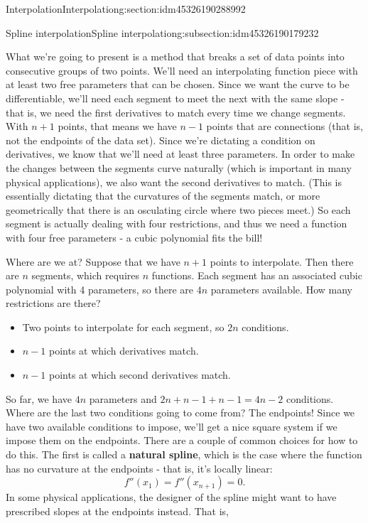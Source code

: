 \documentclass[oneside,10pt,]{article}
\newcommand{\terminology}[1]{\textbf{#1}}
\numberwithin{equation}{section}
\numberwithin{equation}{section}
\begin{document}
\begin{sectionptx}{Interpolation}{}{Interpolation}{}{}{g:section:idm45326190288992}
\begin{subsectionptx}{Spline interpolation}{}{Spline interpolation}{}{}{g:subsection:idm45326190179232}
\par
What we're going to present is a method that breaks a set of data points into consecutive groups of two points. We'll need an interpolating function piece with at least two free parameters that can be chosen. Since we want the curve to be differentiable, we'll need each segment to meet the next with the same slope - that is, we need the first derivatives to match every time we change segments. With \(n+1\) points, that means we have \(n-1\) points that are connections (that is, not the endpoints of the data set). Since we're dictating a condition on derivatives, we know that we'll need at least three parameters. In order to make the changes between the segments curve naturally (which is important in many physical applications), we also want the second derivatives to match. (This is essentially dictating that the curvatures of the segments match, or more geometrically that there is an osculating circle where two pieces meet.) So each segment is actually dealing with four restrictions, and thus we need a function with four free parameters - a cubic polynomial fits the bill!%
\par
Where are we at? Suppose that we have \(n + 1\) points to interpolate. Then there are \(n\) segments, which requires \(n\) functions. Each segment has an associated cubic polynomial with 4 parameters, so there are \(4n\) parameters available. How many restrictions are there?%
\begin{itemize}[label=\textbullet]
\item{}Two points to interpolate for each segment, so \(2n\) conditions.%
\item{}\(n-1\) points at which derivatives match.%
\item{}\(n - 1\) points at which second derivatives match.%
\end{itemize}
%
\par
So far, we have \(4n\) parameters and \(2n + n - 1 + n - 1 = 4n -2\) conditions. Where are the last two conditions going to come from? The endpoints! Since we have two available conditions to impose, we'll get a nice square system if we impose them on the endpoints. There are a couple of common choices for how to do this. The first is called a \terminology{natural spline}, which is the case where the function has no curvature at the endpoints - that is, it's locally linear:%
\begin{equation*}
f''(x_1) = f''(x_{n+1}) = 0.
\end{equation*}
In some physical applications, the designer of the spline might want to have prescribed slopes at the endpoints instead. That is,%

\end{subsectionptx}
\end{sectionptx}
\end{document}
